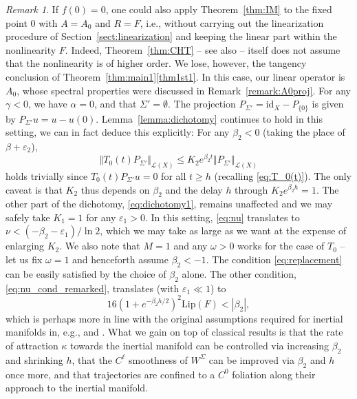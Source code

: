 \documentclass[a4paper, 12pt, oneside, reqno, notitlepage]{amsart}
\theoremstyle{plain}
\theoremstyle{definition}
\theoremstyle{remark}
\newtheorem{remark}[theorem]{Remark}
\newcommand{\lip}{\mathrm{Lip}}
\begin{document}
\begin{remark} \label{remark:IM_with_F}
    If $f(0) = 0$, one could also apply Theorem~\ref{thm:IM} to the fixed point $0$ with $A = A_0$ and $R = F$, i.e., without carrying out the linearization procedure of Section~\ref{sect:linearization} and keeping the linear part within the nonlinearity $F$.
    Indeed, Theorem~\ref{thm:CHT} -- see also \cite{chen1997invariant} -- itself does not assume that the nonlinearity is of higher order. 
    We lose, however, the tangency conclusion of Theorem~\ref{thm:main1}\ref{thm1st1}.
    In this case, our linear operator is $A_0$, whose spectral properties were discussed in Remark~\ref{remark:A0proj}.
    For any $\gamma < 0$, we have $\alpha = 0$, and that $\Sigma' = \emptyset$.
    The projection $P_{\Sigma'} = \mathrm{id}_X - P_{\{0\}}$ is given by $P_{\Sigma'}u = u - u(0)$.
    Lemma~\ref{lemma:dichotomy} continues to hold in this setting, we can in fact deduce this explicitly:
    For any $\beta_2 < 0$ (taking the place of $\beta + \varepsilon_2$), 
    \begin{displaymath}
        \Vert T_0(t) P_{\Sigma'} \Vert_{\mathcal{L}(X)} \leq K_2 e^{\beta_2 t} \Vert P_{\Sigma'} \Vert_{\mathcal{L}(X)}
    \end{displaymath}
    holds trivially since $T_0(t)P_{\Sigma'}u = 0$ for all $t \geq h$ (recalling \eqref{eq:T_0(t)}).
    The only caveat is that $K_2$ thus depends on $\beta_2$ and the delay $h$ through $K_2 e^{\beta_2 h} = 1$.
    The other part of the dichotomy, \eqref{eq:dichotomy1}, remains unaffected and we may safely take $K_1 = 1$ for any $\varepsilon_1 > 0$.
    In this setting, \eqref{eq:nu} translates to $\nu < (-\beta_2-\varepsilon_1)/\ln2$, which we may take as large as we want at the expense of enlarging $K_2$.
    We also note that $M = 1$ and any $\omega > 0$ works for the case of $T_0$ -- let us fix $\omega =1$ and henceforth assume $\beta_2 < -1$.
    The condition \eqref{eq:replacement} can be easily satisfied by the choice of $\beta_2$ alone.
    The other condition, \eqref{eq:nu_cond_remarked}, translates (with $\varepsilon_1 \ll 1$) to
    \begin{equation}
        16 \left( 1 + e^{-\beta_2 h/2}\right)^2  \lip(F) < |\beta_2|,
        \label{eq:h_cond_finale}
    \end{equation}
    which is perhaps more in line with the original  assumptions required for inertial manifolds in, e.g., \cite{driver1968ryabov} and \cite{chicone2003inertial}.
    What we gain on top of classical results is that the rate of attraction $\kappa$ towards the inertial manifold can be controlled via increasing $\beta_2$ and shrinking $h$, that the  $C^\ell$ smoothness of $W^\Sigma$ can be improved via $\beta_2$ and $h$ once more, and that trajectories are confined to a $C^0$ foliation along their approach to the inertial manifold. 
\end{remark}
\end{document}
